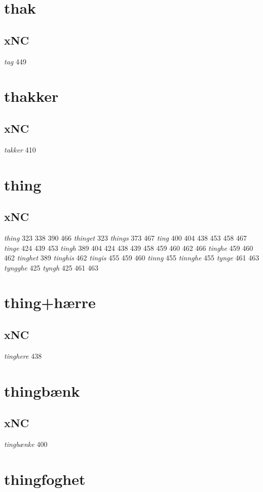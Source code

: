 \documentclass[a4paper,twocolumn]{article}
\begin{document}
\section{thak}
\label{sec:org1a4dea4}
\subsection{xNC}
\label{sec:org7f9c2b2}
\emph{tag} 449 
\section{thakker}
\label{sec:orga055172}
\subsection{xNC}
\label{sec:org13671cb}
\emph{takker} 410 
\section{thing}
\label{sec:orgf35a2a7}
\subsection{xNC}
\label{sec:orgc34eeb4}
\emph{thing} 323 338 390 466 \emph{thinget} 323 \emph{things} 373 467 \emph{ting} 400 404 438 453 458 467 \emph{tinge} 424 439 453 \emph{tingh} 389 404 424 438 439 458 459 460 462 466 \emph{tinghe} 459 460 462 \emph{tinghet} 389 \emph{tinghis} 462 \emph{tingis} 455 459 460 \emph{tinng} 455 \emph{tinnghe} 455 \emph{tynge} 461 463 \emph{tyngghe} 425 \emph{tyngh} 425 461 463 
\section{thing+hærre}
\label{sec:org6d96a0b}
\subsection{xNC}
\label{sec:org09a42d4}
\emph{tinghere} 438 
\section{thingbænk}
\label{sec:org1a93ecc}
\subsection{xNC}
\label{sec:orgd34f36b}
\emph{tingbænke} 400 
\section{thingfoghet}
\label{sec:org24863b0}
\end{document}
